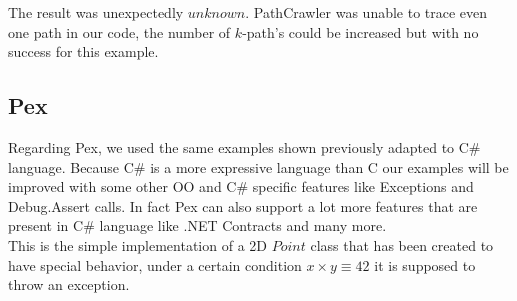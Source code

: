 The result was unexpectedly $unknown$. PathCrawler was unable to trace even one path in our code, the number of $k$-path's could
be increased but with no success for this example.

\subsection{Pex}
Regarding Pex, we used the same examples shown previously adapted to C\# language.
Because C\# is a more expressive language than C our examples will be improved with some other \ac{OO} and C\# specific features like Exceptions and Debug.Assert calls.
In fact Pex can also support a lot more features that are present in C\# language like .NET Contracts and many more.\\
This is the simple implementation of a 2D $Point$ class that has been created to have special behavior, under a certain condition
$x \times y \equiv 42$ it is supposed to throw an exception.

